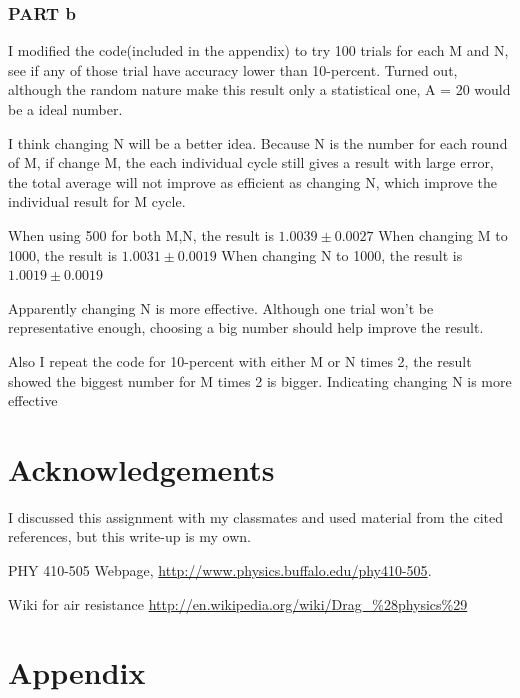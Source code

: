 \documentclass[11pt,letterpaper]{article}
\begin{document}
\subsubsection{PART b}

I modified the code(included in the appendix) to try 100 trials for each M and N, see if any of those trial have accuracy lower than 10-percent. Turned out, although the random nature make this result only a statistical one, A = 20 would be a ideal number. 

I think changing N will be a better idea. Because N is the number for each round of M, if change M, the each individual cycle still gives a result with large error, the total average will not improve as efficient as changing N, which improve the individual result for M cycle.

When using 500 for both M,N, the result is $1.0039\pm0.0027$
When changing M to 1000, the result is $1.0031\pm0.0019$
When changing N to 1000, the result is $1.0019\pm0.0019$

Apparently changing N is more effective. Although one trial won't be representative enough, choosing a big number should help improve the result.  

Also I repeat the code for 10-percent with either M or N times 2, the result showed the biggest number for M times 2 is bigger. Indicating changing N is more effective

\newpage
\section*{Acknowledgements}

I discussed this assignment with my classmates and used material from the
cited references, but this write-up is my own.

\begin{thebibliography}{9}


PHY 410-505 Webpage, \url{http://www.physics.buffalo.edu/phy410-505}.



Wiki for air resistance
\url{http://en.wikipedia.org/wiki/Drag_%28physics%29}


\end{thebibliography}


\newpage

\appendix
\section{Appendix}
\end{document}
